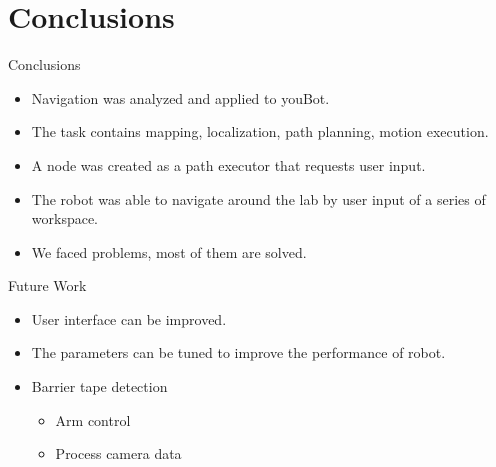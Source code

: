 
\section{Conclusions}
\begin{frame}{Conclusions}
\begin{itemize}
	\item Navigation was analyzed and applied to youBot.    
	\item The task contains mapping, localization, path planning, motion execution.
	\item A node was created as a path executor that requests user input. 
	\item The robot was able to navigate around the lab by user input of a series of workspace.
    \item We faced problems, most of them are solved.
\end{itemize}
\end{frame}
\begin{frame}{Future Work}
\begin{itemize}
	\item User interface can be improved.
	\item The parameters can be tuned to improve the performance of robot.
    \item Barrier tape detection
    \begin{itemize}
        \item Arm control
        \item Process camera data
    \end{itemize}
\end{itemize}
\end{frame}